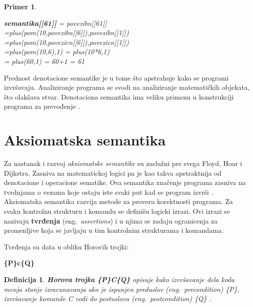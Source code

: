 \documentclass[a4paper]{article}
\newtheorem{primer}{Primer}[section]
\newtheorem{definicija}{Definicija}[section]
\begin{document}
{\begin{primer}
\begin{center}
\textbf{semantika[[61]]} = povezibn[[61]] \\
=plus(pom(10,povezibn[[6]]),povezibn[[1]])\\
=plus(pom(10,povezicn[[6]]),povezicn[[1]]) \\
=plus(pom(10,6),1) = plus(10*6,1)\\
= plus(60,1) = 60+1 = 61

\end{center}
\end{primer}

 Prednost denotacione semantike je u tome što apstrahuje kako se programi izvršavaju. Analiziranje programa se svodi na analiziranje matematičkih objekata, što olakšava stvar. Denotaciona semantika ima veliku primenu u konstrukciji programa za prevođenje \cite{parezanovic}.

\section{Aksiomatska semantika}
\label{sec:akssem}
\qquad Za nastanak i razvoj \textit{aksiomatske semantike}  su zaslužni pre svega Floyd, Hoar i Dijkstra.
 Zasniva na matematickoj logici pa je kao takva apstraktnija od denotacione i operacione sematike. Ova semantika
 značenje programa zasniva na tvrdnjama o vezama koje ostaju iste svaki put kad se program izvrši \cite{slonneger1995book}.
 Aksiomatska semantika razvija metode za proveru korektnosti programa. Za svaku kontrolnu strukturu i komandu se definišu logicki izrazi. Ovi izrazi se nazivaju \textbf{tvrđenja} (eng.~{\em  assertions}) i u njima se zadaju ogranicenja za promenljive koja se javljaju u tim kontrolnim strukturama i komandama.

\begin{tcolorbox}
Tvrđenja su data u obliku  Horovih trojki:

  \center \textbf{\{P\}c\{Q\}}

\end{tcolorbox}




\begin{definicija}
\textbf{Horova trojka \{P\}C\{Q\}} opisuje kako izvršavanje dela koda menja stanje izracunavanja ako je ispunjen preduslov (eng.~{\em  precondition}) \{P\}, izvršavanje komande C vodi do postuslova (eng.~{\em  postcondition}) \{Q\} \cite{milena} .

\end{definicija}

}
\end{document}
